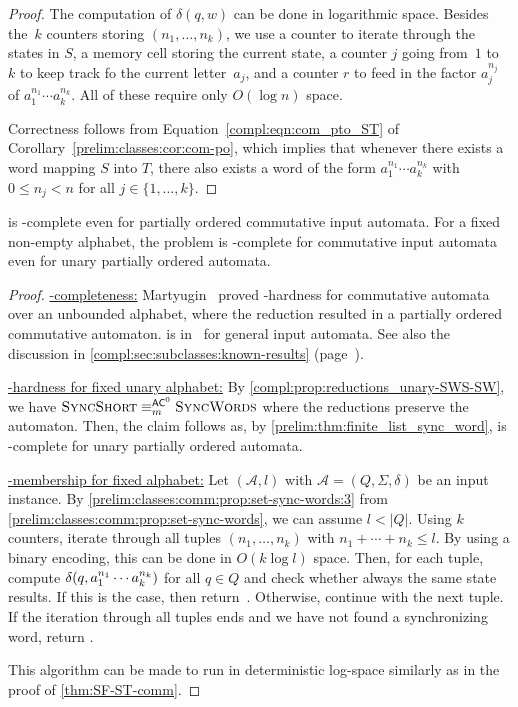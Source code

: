 \begin{proof}
	The computation of $\delta(q,w)$ can be done in logarithmic space.
	Besides the~$k$ counters storing $(n_1,\ldots,n_k)$, we use a counter to
	iterate through the states in $S$, a memory cell storing the current state,
	a counter $j$ going from~$1$ to~$k$ to keep track fo the current letter~$a_j$, and a
	counter $r$ to feed in the factor $a_j^{n_j}$
	of $a_1^{n_1} \cdots a_k^{n_k}$.	
	All of these require only $O(\log n)$ space.
	
	Correctness follows from Equation~\eqref{compl:eqn:com_pto_ST} of
	Corollary~\ref{prelim:classes:cor:com-po}, which implies that whenever there
	exists a word mapping $S$ into $T$, there also exists a word of the form
	$a_1^{n_1}\cdots a_k^{n_k}$ with $0 \le n_j < n$ for all
	$j \in \{1,\ldots,k\}$.
\end{proof}

\begin{theorem}\label{compl:thm:comm-syncshort}
    \DFASWS is \NP-complete even for partially ordered commutative input automata.
	For a fixed non-empty alphabet,
	the problem is \LOGSPACE-complete for commutative input automata  even
	for unary partially ordered automata.
\end{theorem}
\begin{proof}
	\underline{\NP-completeness:} Martyugin~\cite[Prop.~5.3]{Mar2009b}
	proved \NP-hardness for commutative automata over an unbounded alphabet,
	where the reduction resulted in a partially ordered commutative automaton.
	\DFASWS is in \NP\  
	for general input automata. 
	See also the discussion in \cref{compl:sec:subclasses:known-results} (page~\pageref{prelim:classes:intro:DFASWS}).
	
	\medskip\noindent\underline{\LOGSPACE-hardness for fixed unary alphabet:} By \cref{compl:prop:reductions_unary-SWS-SW},
	we have $\text{\sc Sync\-Short} \equiv_m^{\textup{\textsf{AC}}^0} \text{\sc Sync\-Words}$ where the reductions preserve the automaton.
	Then, the claim follows as, by \cref{prelim:thm:finite_list_sync_word}, \DFASW
	is \LOGSPACE-complete for unary partially ordered automata.
		
	\medskip\noindent\underline{\LOGSPACE-membership for fixed alphabet:}
	Let $(\mathcal A, l)$ with $\mathcal A = (Q, \Sigma, \delta)$ 
	be an input instance. By \cref{prelim:classes:comm:prop:set-sync-words:3} from \cref{prelim:classes:comm:prop:set-sync-words},
	we can assume $l < |Q|$.
	Using $k$ counters,
	iterate through all tuples $(n_1, \ldots, n_k)$
	with $n_1 + \cdots + n_k \le l$. By 
	using a binary encoding, this can be done in $O(k \log l)$ space.
	Then, for each tuple, compute 
	$\delta(q,a_1^{n_1} \cdots a_k^{n_k})$ for all $q \in Q$
	and check whether always the same state results.
	If this is the case, then
	return~\rYES. Otherwise, continue with the next tuple. 
	If the iteration through all tuples ends
	and we have not found a synchronizing word, return \rNO.
	
	This algorithm can be made to run in deterministic log-space similarly 
	as in the proof of \cref{thm:SF-ST-comm}.	
\end{proof}

